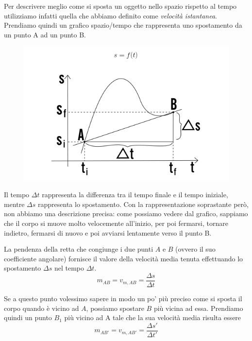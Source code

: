 \documentclass[11pt]{article}
\begin{document}
Per descrivere meglio come si sposta un oggetto nello spazio rispetto al tempo utilizziamo infatti quella che abbiamo definito come \textit{velocità istantanea}. Prendiamo quindi un grafico spazio/tempo che rappresenta uno spostamento da un punto A ad un punto B.

\begin{figure}[H]
\label{veloIst1}
\includegraphics[scale=0.7]{velox_ist_1.png}
\centering
\end{figure}

Il tempo $\Delta t$ rappresenta la differenza tra il tempo finale e il tempo iniziale, mentre $\Delta s$ rappresenta lo spostamento. Con la rappresentazione soprastante però, non abbiamo una descrizione precisa: come possiamo vedere dal grafico, sappiamo che il corpo si muove molto velocemente all'inizio, per poi fermarsi, tornare indietro, fermarsi di nuovo e poi avviarsi lentamente verso il punto B.

La pendenza della retta che congiunge i due punti $A$ e $B$ (ovvero il suo coefficiente angolare) fornisce il valore della velocità media tenuta effettuando lo spostamento $\Delta s$ nel tempo $\Delta t$.
\begin{equation*}
m_{AB} = v_{m, AB} = \frac{\Delta s}{\Delta t}
\end{equation*}

Se a questo punto volessimo sapere in modo un po' più preciso come si sposta il corpo quando è vicino ad $A$, possiamo spostare $B$ più vicina ad essa. Prendiamo quindi un punto $B_1$ più vicino ad A tale che la sua velocità media risulta essere
\begin{equation*}
m_{AB'} = v_{m, AB'} = \frac{\Delta s'}{\Delta t'}
\end{equation*}
\end{document}
